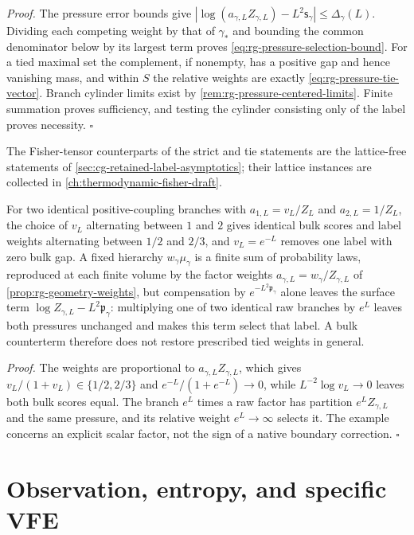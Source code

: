 \noindent\emph{Proof.}
The pressure error bounds give
$|\log(a_{\gamma,L}Z_{\gamma,L})-L^2\mathsf s_\gamma|\leq\Delta_\gamma(L)$.
Dividing each competing weight by that of $\gamma_*$ and bounding the common
denominator below by its largest term proves
\cref{eq:rg-pressure-selection-bound}. For a tied maximal set the complement,
if nonempty, has a positive gap and hence vanishing mass, and within $S$ the
relative weights are exactly \cref{eq:rg-pressure-tie-vector}. Branch
cylinder limits exist by \cref{rem:rg-pressure-centered-limits}. Finite
summation proves sufficiency, and testing the cylinder consisting only of the
label proves necessity. $\square$

The Fisher-tensor counterparts of the strict and tie statements are the
lattice-free statements of \cref{sec:cg-retained-label-asymptotics}; their
lattice instances are collected in \cref{ch:thermodynamic-fisher-draft}.

For two identical positive-coupling branches with $a_{1,L}=v_L/Z_L$ and
$a_{2,L}=1/Z_L$, the choice of $v_L$ alternating between $1$ and $2$ gives
identical bulk scores and label weights alternating between $1/2$ and $2/3$,
and $v_L=e^{-L}$ removes one label with zero bulk gap. A fixed hierarchy
$w_\gamma\mu_\gamma$ is a finite sum of probability laws, reproduced at each
finite volume by the factor weights $a_{\gamma,L}=w_\gamma/Z_{\gamma,L}$ of
\cref{prop:rg-geometry-weights}, but compensation by
$e^{-L^2\mathfrak p_\gamma}$ alone leaves the surface term
$\log Z_{\gamma,L}-L^2\mathfrak p_\gamma$: multiplying one of two identical
raw branches by $e^L$ leaves both pressures unchanged and makes this term
select that label. A bulk counterterm therefore does not restore prescribed
tied weights in general. 

\noindent\emph{Proof.}
The weights are proportional to $a_{\gamma,L}Z_{\gamma,L}$, which gives
$v_L/(1+v_L)\in\{1/2,2/3\}$ and $e^{-L}/(1+e^{-L})\to0$, while
$L^{-2}\log v_L\to0$ leaves both bulk scores equal. The branch $e^L$ times a
raw factor has partition $e^LZ_{\gamma,L}$ and the same pressure, and its
relative weight $e^L\to\infty$ selects it. The example concerns an explicit
scalar factor, not the sign of a native boundary correction. $\square$

\section{Observation, entropy, and specific VFE}
\label{sec:rg-pressure-vfe}

